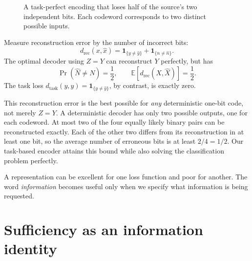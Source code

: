 \begin{figure}[htbp]
\centering
{}
\caption{A task-perfect encoding that loses half of the source's two independent bits. Each codeword corresponds to two distinct possible inputs.}
\label{fig:N20261009-four-to-two}
\end{figure}

Measure reconstruction error by the number of incorrect bits:
\[
 d_{\mathrm{rec}}(x,\widehat x)
 =\mathbf1_{\{y\ne\widehat y\}}+\mathbf1_{\{n\ne\widehat n\}}.
\]
The optimal decoder using \(Z=Y\) can reconstruct \(Y\) perfectly, but has
\[
 \Pr(\widehat N\ne N)=\frac12,\qquad
 \mathbb E[d_{\mathrm{rec}}(X,\widehat X)]=\frac12.
\]
The task loss \(d_{\mathrm{task}}(y,\widehat y)=\mathbf1_{\{y\ne\widehat y\}}\), by contrast, is exactly zero.

This reconstruction error is the best possible for \emph{any} deterministic one-bit code, not merely \(Z=Y\). A deterministic decoder has only two possible outputs, one for each codeword. At most two of the four equally likely binary pairs can be reconstructed exactly. Each of the other two differs from its reconstruction in at least one bit, so the average number of erroneous bits is at least \(2/4=1/2\). Our task-based encoder attains this bound while also solving the classification problem perfectly.

A representation can be excellent for one loss function and poor for another. The word \emph{information} becomes useful only when we specify what information is being requested.

\section{Sufficiency as an information identity}

